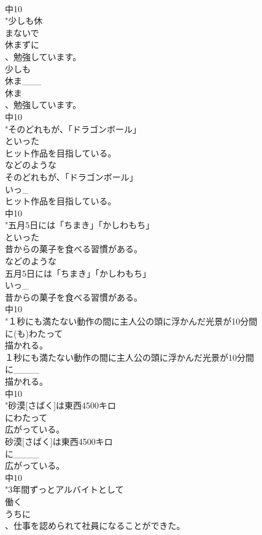 \documentclass[8pt]{extreport}
\begin{document}
\begin{CJK}{UTF8}{min}
\\	中10
\\	"少しも休
\\	まないで
\\	休まずに
\\	、勉強しています。
\\	少しも
\\	休ま___
\\	休ま
\\	、勉強しています。
\\	中10
\\	"そのどれもが、「ドラゴンボール」
\\	といった
\\	ヒット作品を目指している。
\\	などのような
\\	そのどれもが、「ドラゴンボール」
\\	いっ_
\\	ヒット作品を目指している。
\\	中10
\\	"五月5日には「ちまき」「かしわもち」
\\	といった
\\	昔からの菓子を食べる習慣がある。
\\	などのような
\\	五月5日には「ちまき」「かしわもち」
\\	いっ_
\\	昔からの菓子を食べる習慣がある。
\\	中10
\\	"１秒にも満たない動作の間に主人公の頭に浮かんだ光景が10分間
\\	に(も)わたって
\\	描かれる。
\\	１秒にも満たない動作の間に主人公の頭に浮かんだ光景が10分間
\\	に____
\\	描かれる。
\\	中10
\\	"砂漠[さばく]は東西4500キロ
\\	にわたって
\\	広がっている。
\\	砂漠[さばく]は東西4500キロ
\\	に____
\\	広がっている。
\\	中10
\\	"3年間ずっとアルバイトとして
\\	働く
\\	うちに
\\	、仕事を認められて社員になることができた。

\end{CJK}
\end{document}
